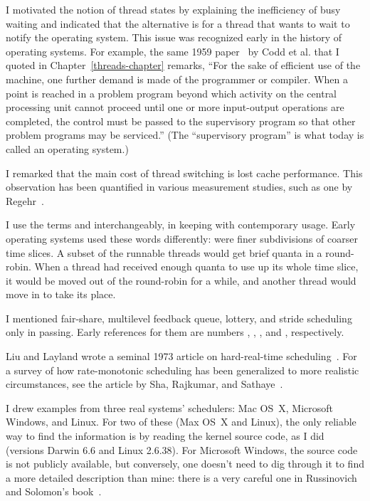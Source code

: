 I motivated the notion of thread states by explaining the
inefficiency of busy waiting and indicated that the alternative is
for a thread that wants to wait to notify the operating system.  This
issue was recognized early in the history of operating systems.  For
example, the same 1959 paper~\cite{max984} by Codd et al. that
I quoted in Chapter~\ref{threads-chapter} remarks, ``For the sake of efficient
use of the machine, one further demand is made of the programmer or
compiler.  When a point is reached in a problem program beyond which
activity on the central processing unit cannot proceed until one or
more input-output operations are completed, the control must be passed
to the supervisory program so that other problem programs may be
serviced.''  (The ``supervisory program'' is what today is called an
operating system.)

I remarked that the main cost of thread switching is lost
cache
performance.  This observation has been quantified in various
measurement studies, such as one by Regehr~\cite{max973}.

I use the terms  and 
interchangeably, in keeping with contemporary usage.  Early operating
systems used these words differently:  were finer subdivisions
of coarser time slices.  A subset of the runnable threads would get
brief quanta in a round-robin.  When a thread had received enough
quanta to use up its whole time slice, it would be moved out of the
round-robin for a while, and another thread would move in to take its
place.

I mentioned fair-share, multilevel
feedback queue,
lottery, and
stride scheduling only in passing.
Early references for them are numbers \cite{max967}, \cite{max1169}, \cite{max968}, and
\cite{max969}, respectively.

Liu and
Layland wrote a seminal 1973 article on
hard-real-time scheduling~\cite{max966}.  For a survey of how rate-monotonic scheduling has been
generalized to more realistic circumstances, see the article by
Sha,
Rajkumar, and Sathaye~\cite{max965}.

I drew examples from three real systems' schedulers: Mac OS~X,
Microsoft Windows, and Linux.  For two of these (Max OS~X and Linux),
the only reliable way to find the information is by reading the kernel
source code, as I did (versions Darwin 6.6 and Linux 2.6.38).
For Microsoft Windows, the source code is not publicly available, but
conversely, one doesn't need to dig through it to find a more detailed
description than mine: there is a very careful one in
Russinovich and Solomon's
book~\cite{max981}.

